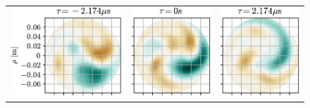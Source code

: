 \begin{figure}[h!]
\begin{tabular}{ccc}
  \includegraphics{fig/results/blobs/matrix-perp-blobs-B0_0.08-fluct/3} &
  \includegraphics{fig/results/blobs/matrix-perp-blobs-B0_0.08-fluct/4} &
  \includegraphics{fig/results/blobs/matrix-perp-blobs-B0_0.08-fluct/5} \\

\end{tabular}
\end{figure}
